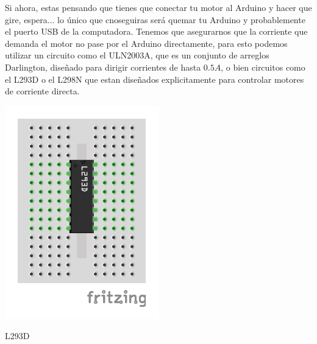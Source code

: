 		Si ahora, estas pensando que tienes que conectar tu motor al Arduino y hacer que gire, espera... lo único que cnoseguiras será quemar tu Arduino y probablemente el puerto USB de la computadora. Tenemos que asegurarnos que la corriente que demanda el motor no pase por el Arduino directamente, para esto podemos utilizar un circuito como el ULN2003A, que es un conjunto de arreglos Darlington, diseñado para dirigir corrientes de hasta $0.5A$, o bien circuitos como el L293D o el L298N que estan diseñados explicitamente para controlar motores de corriente directa.

		\begin{marginfigure}
			\begin{center}
				\includegraphics[width=\textwidth]{images/L293D.pdf}
				\caption{L293D}
				\label{fig:CI}
			\end{center}
		\end{marginfigure}

